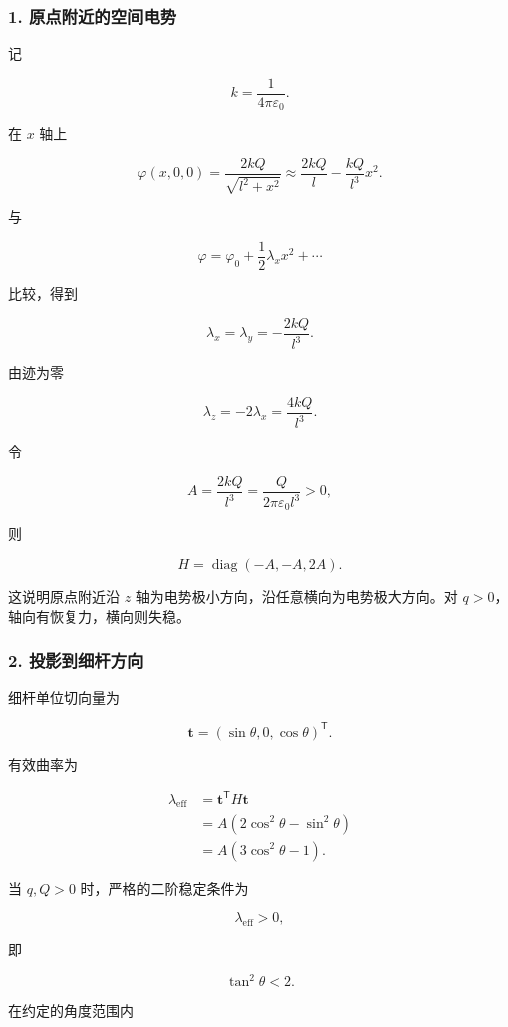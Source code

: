 \subsubsection{1.
原点附近的空间电势}\label{m2:ux539fux70b9ux9644ux8fd1ux7684ux7a7aux95f4ux7535ux52bf}

记

\[
k=\frac1{4\pi\varepsilon_0}.
\]

在 \(x\) 轴上

\[
\varphi(x,0,0)
=\frac{2kQ}{\sqrt{l^2+x^2}}
\approx\frac{2kQ}{l}-\frac{kQ}{l^3}x^2.
\]

与

\[
\varphi=\varphi_0+\frac12\lambda_x x^2+\cdots
\]

比较，得到

\[
\lambda_x=\lambda_y=-\frac{2kQ}{l^3}.
\]

由迹为零

\[
\lambda_z=-2\lambda_x=\frac{4kQ}{l^3}.
\]

令

\[
A=\frac{2kQ}{l^3}
=\frac{Q}{2\pi\varepsilon_0l^3}>0,
\]

则

\[
H=\operatorname{diag}(-A,-A,2A).
\]

这说明原点附近沿 \(z\) 轴为电势极小方向，沿任意横向为电势极大方向。对
\(q>0\)，轴向有恢复力，横向则失稳。

\subsubsection{2.
投影到细杆方向}\label{m2:ux6295ux5f71ux5230ux7ec6ux6746ux65b9ux5411}

细杆单位切向量为

\[
\mathbf t=(\sin\theta,0,\cos\theta)^{\mathsf T}.
\]

有效曲率为

\[
\begin{aligned}
\lambda_{\mathrm{eff}}
&=\mathbf t^{\mathsf T}H\mathbf t\\
&=A(2\cos^2\theta-\sin^2\theta)\\
&=A(3\cos^2\theta-1).
\end{aligned}
\]

当 \(q,Q>0\) 时，严格的二阶稳定条件为

\[
\lambda_{\mathrm{eff}}>0,
\]

即

\[
\boxed{\tan^2\theta<2.}
\]

在约定的角度范围内

